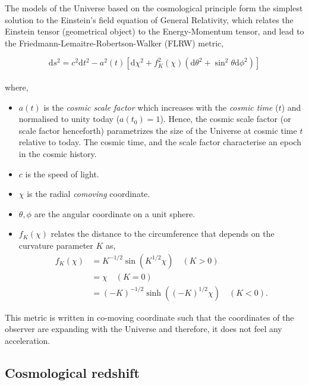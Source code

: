 The models of the Universe based on the cosmological principle form the simplest 
solution to the Einstein's field equation of General Relativity, 
which relates the Einstein tensor (geometrical object) to the Energy-Momentum tensor, 
and lead to the
Friedmann-Lemaitre-Robertson-Walker (FLRW) metric,

\begin{equation}
	\mathrm{d}s^2 = c^2\mathrm{d}t^2 - a^2(t)\left[ \mathrm{d}\chi^2 + f_K^2(\chi)
					\left( \mathrm{d}\theta^2 + \sin^2\theta \mathrm{d}\phi^2 
					\right)  \right]
	\label{eqn:metric}
\end{equation}
\\
where, 
\begin{itemize}
\item $a(t)$ is the {\it cosmic scale factor} which increases with the {\it cosmic time} ($t$)
and normalised to unity today ($a(t_0)=1$). 
Hence, the cosmic scale factor (or scale factor henceforth) parametrizes the
size of the Universe at cosmic time $t$ relative to today. The cosmic time, 
and the scale factor characterise an epoch in the cosmic history.
\item $c$ is the speed of light. 
\item $\chi$ is the
radial {\it comoving} coordinate.
\item $\theta, \phi$ are the angular coordinate on a
unit sphere. 
\item $f_K(\chi)$ relates the distance to the circumference that depends 
on the curvature parameter $K$ as,
\begin{equation} \label{eq1}
\begin{split}
f_K(\chi) & = K^{-1/2} \sin(K^{1/2}\chi) \quad (K>0) \\
 & = \chi \quad (K=0) \\
 & = (-K)^{-1/2} \sinh((-K)^{1/2}\chi) \quad (K<0).
\end{split}
\end{equation}
\end{itemize}

This metric is written in co-moving coordinate such that the coordinates of the
observer are expanding with the Universe and therefore, it does not feel any
acceleration.



\subsection{Cosmological redshift}

